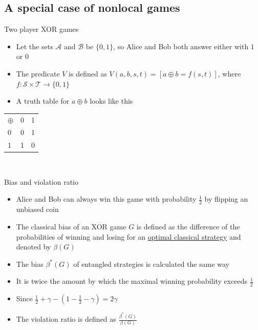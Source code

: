 \subsection{A special case of nonlocal games}
\begin{frame}{Two player XOR games}
\begin{itemize}
    \item Let the sets $\mathcal{A}$ and $\mathcal{B}$ be $\{0,1\}$, so Alice and Bob both answer either with $1$ or $0$ \pause
    \item The predicate $V$ is defined as $V(a,b,s,t) = [ a\oplus b = f(s,t)]$, where $f: \mathcal{S} \times \mathcal{T} \rightarrow \{0,1\}$ \pause
    \item A truth table for $a \oplus b$ looks like this
\end{itemize}
    \begin{center}
\begin{tabular}{l | c r }
$\oplus$ & 0 & 1 \\
\cline{1-3} 

0 & 0 & 1 \\
1 & 1 & 0 
\end{tabular}\\
\end{center}
\end{frame}

\begin{frame}{Bias and violation ratio}
\begin{itemize}
    \item Alice and Bob can always win this game with probability $\frac{1}{2}$ by flipping an unbiased coin \pause
    \item The classical bias of an XOR game $G$ is defined as the difference of the probabilities of winning and losing for an \underline{optimal classical strategy} and denoted by $\beta(G)$ \pause
    \item The bias $\beta^*(G)$ of entangled strategies is calculated the same way \pause
    \item It is twice the amount by which the maximal winning probability exceeds $\frac{1}{2}$ \pause
    \item Since $\frac{1}{2}+ \gamma -(1-\frac{1}{2}-\gamma) = 2\gamma$ \pause
    \item The violation ratio is defined as $\frac{\beta^*(G)}{\beta(G)}$
\end{itemize}    
\end{frame}

